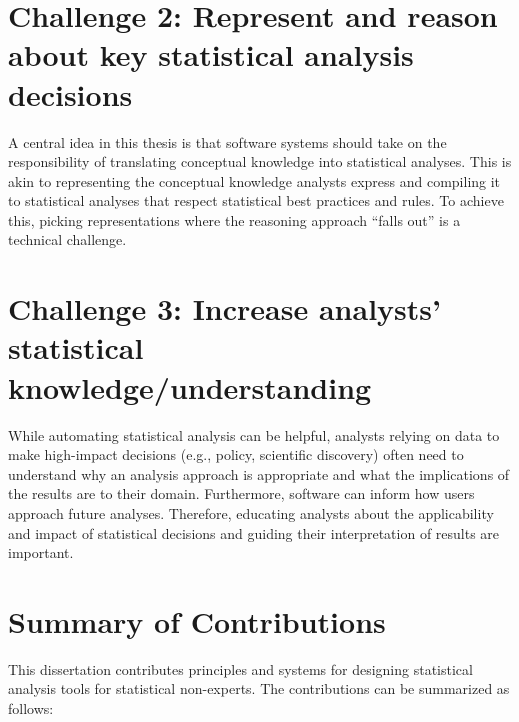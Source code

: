 

\section*{Challenge 2: Represent and reason about key statistical analysis decisions} %
A central idea in this thesis is that software systems should take on the
responsibility of translating conceptual knowledge into statistical analyses.
This is akin to representing the conceptual
knowledge analysts express and compiling it to statistical
analyses that respect statistical best practices and rules. 
To achieve this, picking representations where the reasoning approach ``falls out'' is a technical challenge.

\section*{Challenge 3: Increase analysts' statistical knowledge/understanding} %
While automating statistical analysis can be helpful, analysts relying on data
to make high-impact decisions (e.g., policy, scientific discovery) often need to
understand why an analysis approach is appropriate and what the implications of
the results are to their domain. Furthermore, software can inform how users
approach future analyses. Therefore, educating analysts about the applicability
and impact of statistical decisions and guiding their interpretation of results
are important.

\section{Summary of Contributions}
This dissertation contributes principles and systems for designing statistical analysis
tools for statistical non-experts. The contributions can be summarized as follows: 

